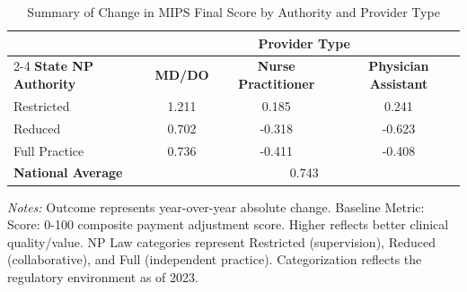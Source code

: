 \begin{table}[htbp]
    \centering
    \caption{Summary of Change in MIPS Final Score by Authority and Provider Type}
    \label{tab:d_mips_final_score}
    \vspace{0.2cm}
    \begin{tabular}{lccc}
        \toprule
        & \multicolumn{3}{c}{\textbf{Provider Type}} \\
        \cmidrule(lr){2-4}
        \textbf{State NP Authority} & \textbf{MD/DO} & \textbf{Nurse Practitioner} & \textbf{Physician Assistant} \\
        \midrule
        Restricted & 1.211 & 0.185 & 0.241 \\
        Reduced & 0.702 & -0.318 & -0.623 \\
        Full Practice & 0.736 & -0.411 & -0.408 \\
        \midrule
        \textbf{National Average} & \multicolumn{3}{c}{0.743} \\
        \bottomrule
    \end{tabular}
    \vspace{0.1cm}
    \begin{minipage}{0.85\textwidth}
        \footnotesize \textit{Notes:} Outcome represents year-over-year absolute change. Baseline Metric: Score: 0-100 composite payment adjustment score. Higher reflects better clinical quality/value. NP Law categories represent Restricted (supervision), Reduced (collaborative), and Full (independent practice). Categorization reflects the regulatory environment as of 2023.
    \end{minipage}
\end{table}